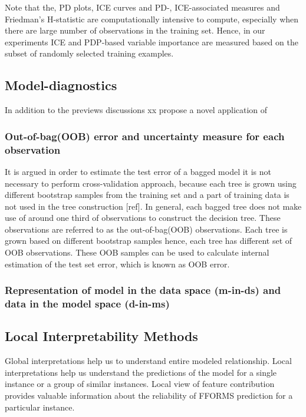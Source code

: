 \documentclass[11pt,a4paper,]{article}
\theoremstyle{definition}
\theoremstyle{definition}
\theoremstyle{definition}
\theoremstyle{remark}
\begin{document}
Note that the, PD plots, ICE curves and PD-, ICE-associated measures and
Friedman's H-statistic are computationally intensive to compute,
especially when there are large number of observations in the training
set. Hence, in our experiments ICE and PDP-based variable importance are
measured based on the subset of randomly selected training examples.

\subsection{Model-diagnostics}\label{model-diagnostics}

In addition to the previews discussions xx propose a novel application
of

\subsubsection{Out-of-bag(OOB) error and uncertainty measure for each
observation}\label{out-of-bagoob-error-and-uncertainty-measure-for-each-observation}

It is argued in order to estimate the test error of a bagged model it is
not necessary to perform cross-validation approach, because each tree is
grown using different bootstrap samples from the training set and a part
of training data is not used in the tree construction {[}ref{]}. In
general, each bagged tree does not make use of around one third of
observations to construct the decision tree. These observations are
referred to as the out-of-bag(OOB) observations. Each tree is grown
based on different bootstrap samples hence, each tree has different set
of OOB observations. These OOB samples can be used to calculate internal
estimation of the test set error, which is known as OOB error.

\subsubsection{Representation of model in the data space (m-in-ds) and
data in the model space
(d-in-ms)}\label{representation-of-model-in-the-data-space-m-in-ds-and-data-in-the-model-space-d-in-ms}

\subsection{Local Interpretability
Methods}\label{local-interpretability-methods}

Global interpretations help us to understand entire modeled
relationship. Local interpretations help us understand the predictions
of the model for a single instance or a group of similar instances.
Local view of feature contribution provides valuable information about
the reliability of FFORMS prediction for a particular instance.
\end{document}
